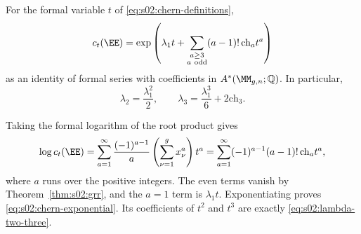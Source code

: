 \begin{lmm}
\label{lmm:s02:chern-exponential}
For the formal variable $t$ of \eqref{eq:s02:chern-definitions},
\begin{equation}
\label{eq:s02:chern-exponential}
c_t(\EE)=\exp\left(
\lambda_1t+
\sum_{\substack{a\geq3\\a\ \mathrm{odd}}}
(a-1)!\,\mathrm{ch}_a t^a\right)
\end{equation}
as an identity of formal series with coefficients in
$A^*(\MM_{g,n};\mathbb Q)$.  In particular,
\begin{equation}
\label{eq:s02:lambda-two-three}
\lambda_2=\frac{\lambda_1^2}{2},
\qquad
\lambda_3=\frac{\lambda_1^3}{6}+2\mathrm{ch}_3.
\end{equation}
\end{lmm}

\begin{prf}
Taking the formal logarithm of the root product gives
\[
\log c_t(\EE)
=\sum_{a=1}^{\infty}\frac{(-1)^{a-1}}{a}
\left(\sum_{\nu=1}^g x_\nu^a\right)t^a
=\sum_{a=1}^{\infty}(-1)^{a-1}(a-1)!\,
\mathrm{ch}_a t^a,
\]
where $a$ runs over the positive integers.  The even terms vanish by
Theorem~\ref{thm:s02:grr}, and the $a=1$ term is $\lambda_1t$.
Exponentiating proves \eqref{eq:s02:chern-exponential}.  Its
coefficients of $t^2$ and $t^3$ are exactly
\eqref{eq:s02:lambda-two-three}.
\end{prf}

